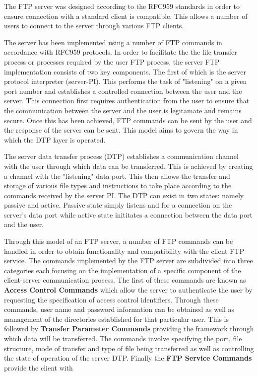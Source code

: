 \documentclass[10pt,twocolumn]{witseiepaper}
\begin{document}
The FTP server was designed according to the RFC959 standards in order to ensure connection with a standard client is compatible. This allows a number of users to connect to the server through various FTP clients.

The server has been implemented using a number of FTP commands in accordance with RFC959 protocols. In order to facilitate the the file transfer process or processes required by the user FTP process, the server FTP implementation consists of two key components. The first of which is the server protocol interpreter (server-PI). This performs the task of "listening" on a given port number and establishes a controlled connection between the user and the server. This connection first requires authentication from the user to ensure that the communication between the server and the user is legitamate and remains secure. Once this has been achieved, FTP commands can be sent by the user and the response of the server can be sent. This model aims to govern the way in which the DTP layer is operated.

The server data transfer process (DTP) establishes a communication channel with the user through which data can be transferred. This is achieved by creating a channel with the "listening" data port. This then allows the transfer and storage of various file types and instructions to take place according to the commands received by the server PI. The DTP can exist in two states: namely passive and active. Passive state simply listens and for a connection on the server's data port while active state inititates a connection between the data port and the user.

Through this model of an FTP server, a number of FTP commands can be handled in order to obtain functionality and compatibility with the client FTP service. The commands implemented by the FTP server are subdivided into three categories each focusing on the implementation of a specific component of the client-server communication process. The first of these commands are known as \textbf{Access Control Commands} which allow the server to authenticate the user by requesting the specification of access control identifiers. Through these commands, user name and password information can be obtained as well as management of the directories established for that particular user. This is followed by \textbf{Transfer Parameter Commands} providing the framework through which data will be transferred. The commands involve specifying the port, file structure, mode of transfer and type of file being transferred as well as controlling the state of operation of the server DTP. Finally the \textbf{FTP Service Commands} provide the client with 
\end{document}
